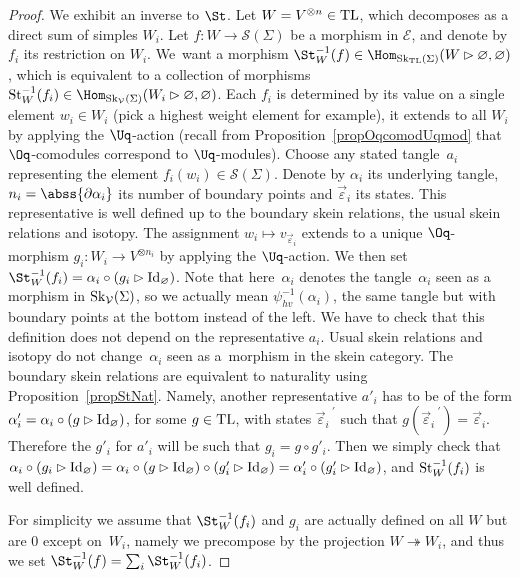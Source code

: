 \begin{proof}
We exhibit an inverse to $\St$. Let $W=V^{\otimes n}\in {\rm TL}$, which decomposes as a direct sum of simples $W_i$. Let $f\colon W\to \mathscr{S}(\Sigma)$ be a morphism in $\mathcal{E}$, and denote by $f_i$ its restriction on $W_i$. We~want a morphism $\St_W^{-1}(f) \in \Hom_{{\rm Sk}_{{\rm TL}}(\Sigma)}(W\rhd \varnothing,\varnothing)$, which is equivalent to a collection of morphisms ${\rm St}_W^{-1}(f_i) \in \Hom_{{\rm Sk}_{\mathcal{V}}(\Sigma)}(W_i\rhd \varnothing,\varnothing)$. Each $f_i$ is determined by its value on a single element $w_i\in W_i$ (pick a highest weight element for example), it extends to all $W_i$ by applying the $\Uq$-action (recall from Proposition~\ref{propOqcomodUqmod} that $\Oq$-comodules correspond to $\Uq$-modules). Choose any stated tangle~$a_i$ representing the element $f_i(w_i) \in \mathscr{S}(\Sigma)$. Denote by $\alpha_i$ its underlying tangle, $n_i=\abss{\partial \alpha_i}$ its number of boundary points and $\vec{\varepsilon}_i$ its states. This representative is well defined up to the boundary skein relations, the usual skein relations and isotopy. The assignment $w_i \mapsto v_{\vec{\varepsilon}_i}$ extends to a unique $ \Oq$-morphism $g_i\colon W_i \to V^{\otimes n_i}$ by applying the $\Uq$-action. We then set $\St_W^{-1}(f_i) = \alpha_i\circ (g_i \rhd {\rm Id}_\varnothing)$. Note that here~$\alpha_i$ denotes the tangle~$\alpha_i$ seen as a morphism in ${\rm Sk}_\mathcal{V}(\Sigma)$, so we actually mean $\psi_{hv}^{-1}(\alpha_i)$, the same tangle but with boundary points at the bottom instead of the left. We have to check that this definition does not depend on the representative $a_i$. Usual skein relations and isotopy do not change~$\alpha_i$ seen as a~morphism in the skein category. The boundary skein relations are equivalent to naturality using Proposition~\ref{propStNat}. Namely, another representative $a'_i$ has to be of the form $\alpha'_i= \alpha_i \circ (g \rhd {\rm Id}_\varnothing)$, for some $g \in {\rm TL}$, with states ${\vec{\varepsilon}_i}^{\ '}$ such that $g({\vec{\varepsilon}_i}^{\ '})=\vec{\varepsilon}_i$. Therefore the $g'_i$ for $a'_i$ will be such that $g_i = g \circ g'_i$. Then we simply check that $\alpha_i\circ (g_i \rhd {\rm Id}_\varnothing) = \alpha_i\circ (g \rhd {\rm Id}_\varnothing) \circ (g'_i \rhd {\rm Id}_\varnothing) = \alpha'_i\circ (g'_i \rhd {\rm Id}_\varnothing)$, and ${\rm St}_W^{-1}(f_i)$ is well defined.

For simplicity we assume that $\St_W^{-1}(f_i)$ and $g_i$ are actually defined on all $W$ but are 0 except on~$W_i$, namely we precompose by the projection $W \twoheadrightarrow W_i$, and thus we set $\St_W^{-1}(f) = \sum_i \St_W^{-1}(f_i)$.


\end{proof}
